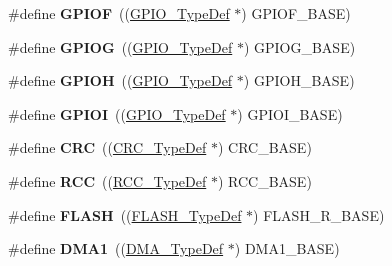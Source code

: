 \begin{DoxyCompactItemize}
\#define {\bfseries G\+P\+I\+OF}~((\mbox{\hyperlink{struct_g_p_i_o___type_def}{G\+P\+I\+O\+\_\+\+Type\+Def}} $\ast$) G\+P\+I\+O\+F\+\_\+\+B\+A\+SE)
\item 
\mbox{\label{group___peripheral__declaration_ga02a2a23a32f9b02166a8c64012842414}} 
\#define {\bfseries G\+P\+I\+OG}~((\mbox{\hyperlink{struct_g_p_i_o___type_def}{G\+P\+I\+O\+\_\+\+Type\+Def}} $\ast$) G\+P\+I\+O\+G\+\_\+\+B\+A\+SE)
\item 
\mbox{\label{group___peripheral__declaration_gadeacbb43ae86c879945afe98c679b285}} 
\#define {\bfseries G\+P\+I\+OH}~((\mbox{\hyperlink{struct_g_p_i_o___type_def}{G\+P\+I\+O\+\_\+\+Type\+Def}} $\ast$) G\+P\+I\+O\+H\+\_\+\+B\+A\+SE)
\item 
\mbox{\label{group___peripheral__declaration_gad15f13545ecdbbabfccf43d5997e5ade}} 
\#define {\bfseries G\+P\+I\+OI}~((\mbox{\hyperlink{struct_g_p_i_o___type_def}{G\+P\+I\+O\+\_\+\+Type\+Def}} $\ast$) G\+P\+I\+O\+I\+\_\+\+B\+A\+SE)
\item 
\mbox{\label{group___peripheral__declaration_ga4381bb54c2dbc34500521165aa7b89b1}} 
\#define {\bfseries C\+RC}~((\mbox{\hyperlink{struct_c_r_c___type_def}{C\+R\+C\+\_\+\+Type\+Def}} $\ast$) C\+R\+C\+\_\+\+B\+A\+SE)
\item 
\mbox{\label{group___peripheral__declaration_ga74944438a086975793d26ae48d5882d4}} 
\#define {\bfseries R\+CC}~((\mbox{\hyperlink{struct_r_c_c___type_def}{R\+C\+C\+\_\+\+Type\+Def}} $\ast$) R\+C\+C\+\_\+\+B\+A\+SE)
\item 
\mbox{\label{group___peripheral__declaration_ga844ea28ba1e0a5a0e497f16b61ea306b}} 
\#define {\bfseries F\+L\+A\+SH}~((\mbox{\hyperlink{struct_f_l_a_s_h___type_def}{F\+L\+A\+S\+H\+\_\+\+Type\+Def}} $\ast$) F\+L\+A\+S\+H\+\_\+\+R\+\_\+\+B\+A\+SE)
\item 
\mbox{\label{group___peripheral__declaration_gacc16d2a5937f7585320a98f7f6b578f9}} 
\#define {\bfseries D\+M\+A1}~((\mbox{\hyperlink{struct_d_m_a___type_def}{D\+M\+A\+\_\+\+Type\+Def}} $\ast$) D\+M\+A1\+\_\+\+B\+A\+SE)

\end{DoxyCompactItemize}
